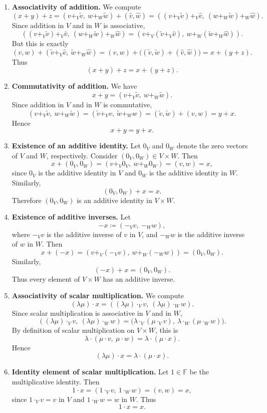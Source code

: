 \documentclass[12pt]{article}
\begin{document}
\begin{enumerate}[label=\textbf{A\arabic*.}]
\item \textbf{Associativity of addition.}  
We compute
\[
(x+y)+z
=
(v+_V\tilde v,\ w+_W\tilde w)+(\hat v,\hat w)
=
((v+_V\tilde v)+_V\hat v,\ (w+_W\tilde w)+_W\hat w).
\]
Since addition in \(V\) and in \(W\) is associative,
\[
((v+_V\tilde v)+_V\hat v,\ (w+_W\tilde w)+_W\hat w)
=
(v+_V(\tilde v+_V\hat v),\ w+_W(\tilde w+_W\hat w)).
\]
But this is exactly
\[
(v,w)+(\tilde v+_V\hat v,\ \tilde w+_W\hat w)
=
(v,w)+\bigl((\tilde v,\tilde w)+(\hat v,\hat w)\bigr)
=
x+(y+z).
\]
Thus
\[
(x+y)+z=x+(y+z).
\]

\item \textbf{Commutativity of addition.}  
We have
\[
x+y=(v+_V\tilde v,\ w+_W\tilde w).
\]
Since addition in \(V\) and in \(W\) is commutative,
\[
(v+_V\tilde v,\ w+_W\tilde w)
=
(\tilde v+_V v,\ \tilde w+_W w)
=
(\tilde v,\tilde w)+(v,w)
=
y+x.
\]
Hence
\[
x+y=y+x.
\]

\item \textbf{Existence of an additive identity.}  
Let \(0_V\) and \(0_W\) denote the zero vectors of \(V\) and \(W\), respectively. Consider \((0_V,0_W)\in V\times W\). Then
\[
x+(0_V,0_W)
=
(v+_V 0_V,\ w+_W 0_W)
=
(v,w)
=
x,
\]
since \(0_V\) is the additive identity in \(V\) and \(0_W\) is the additive identity in \(W\). Similarly,
\[
(0_V,0_W)+x=x.
\]
Therefore \((0_V,0_W)\) is an additive identity in \(V\times W\).

\item \textbf{Existence of additive inverses.}  
Let
\[
-x\coloneqq (-_V v,\ -_W w),
\]
where \(-_V v\) is the additive inverse of \(v\) in \(V\), and \(-_W w\) is the additive inverse of \(w\) in \(W\). Then
\[
x+(-x)
=
(v+_V(-_V v),\ w+_W(-_W w))
=
(0_V,0_W).
\]
Similarly,
\[
(-x)+x=(0_V,0_W).
\]
Thus every element of \(V\times W\) has an additive inverse.

\item \textbf{Associativity of scalar multiplication.}  
We compute
\[
(\lambda\mu)\cdot x
=
((\lambda\mu)\cdot_V v,\ (\lambda\mu)\cdot_W w).
\]
Since scalar multiplication is associative in \(V\) and in \(W\),
\[
((\lambda\mu)\cdot_V v,\ (\lambda\mu)\cdot_W w)
=
\bigl(\lambda\cdot_V(\mu\cdot_V v),\ \lambda\cdot_W(\mu\cdot_W w)\bigr).
\]
By definition of scalar multiplication on \(V\times W\), this is
\[
\lambda\cdot (\mu\cdot v,\ \mu\cdot w)
=
\lambda\cdot(\mu\cdot x).
\]
Hence
\[
(\lambda\mu)\cdot x=\lambda\cdot(\mu\cdot x).
\]

\item \textbf{Identity element of scalar multiplication.}  
Let \(1\in\mathbb F\) be the multiplicative identity. Then
\[
1\cdot x=(1\cdot_V v,\ 1\cdot_W w)=(v,w)=x,
\]
since \(1\cdot_V v=v\) in \(V\) and \(1\cdot_W w=w\) in \(W\). Thus
\[
1\cdot x=x.
\]


\end{enumerate}
\end{document}
